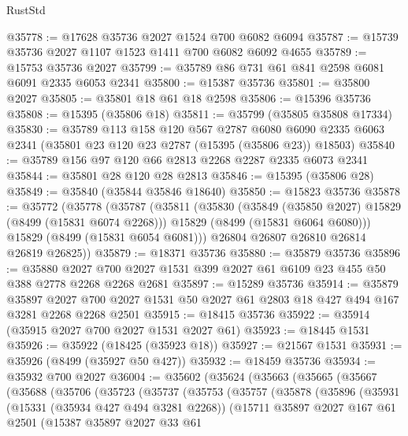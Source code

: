 \begin{lexlean}{RustStd}
\begin{coremodule}
@35778 := @17628 @35736 @2027 @1524 @700 @6082 @6094
@35787 := @15739 @35736 @2027 @1107 @1523 @1411 @700 @6082 @6092 @4655
@35789 := @15753 @35736 @2027
@35799 := @35789 @86 @731 @61 @841 @2598 @6081 @6091 @2335 @6053 @2341
@35800 := @15387 @35736
@35801 := @35800 @2027
@35805 := @35801 @18 @61 @18 @2598
@35806 := @15396 @35736
@35808 := @15395 (@35806 @18)
@35811 := @35799 (@35805 @35808 @17334)
@35830 := @35789
    @113
    @158
    @120
    @567
    @2787
    @6080
    @6090
    @2335
    @6063
    @2341
    (@35801 @23 @120 @23 @2787 (@15395 (@35806 @23)) @18503)
@35840 := @35789 @156 @97 @120 @66 @2813 @2268 @2287 @2335 @6073 @2341
@35844 := @35801 @28 @120 @28 @2813
@35846 := @15395 (@35806 @28)
@35849 := @35840 (@35844 @35846 @18640)
@35850 := @15823 @35736
@35878 := @35772
    (@35778
      (@35787
        (@35811
          (@35830
            (@35849 (@35850 @2027) @15829 (@8499 (@15831 @6074 @2268)))
            @15829
            (@8499 (@15831 @6064 @6080)))
          @15829
          (@8499 (@15831 @6054 @6081)))
        @26804
        @26807
        @26810
        @26814
        @26819
        @26825))
@35879 := @18371 @35736
@35880 := @35879 @35736
@35896 := @35880
    @2027
    @700
    @2027
    @1531
    @399
    @2027
    @61
    @6109
    @23
    @455
    @50
    @388
    @2778
    @2268
    @2268
    @2681
@35897 := @15289 @35736
@35914 := @35879
    @35897
    @2027
    @700
    @2027
    @1531
    @50
    @2027
    @61
    @2803
    @18
    @427
    @494
    @167
    @3281
    @2268
    @2268
    @2501
@35915 := @18415 @35736
@35922 := @35914 (@35915 @2027 @700 @2027 @1531 @2027 @61)
@35923 := @18445 @1531
@35926 := @35922 (@18425 (@35923 @18))
@35927 := @21567 @1531
@35931 := @35926 (@8499 (@35927 @50 @427))
@35932 := @18459 @35736
@35934 := @35932 @700 @2027
@36004 := @35602
    (@35624
      (@35663
        (@35665
          (@35667
            (@35688
              (@35706
                (@35723
                  (@35737
                    (@35753
                      (@35757
                        (@35878
                          (@35896
                            (@35931
                              (@15331 (@35934 @427 @494 @3281 @2268))
                              (@15711
                                @35897
                                @2027
                                @167
                                @61
                                @2501
                                (@15387
                                  @35897
                                  @2027
                                  @33
                                  @61

\end{coremodule}
\end{lexlean}
